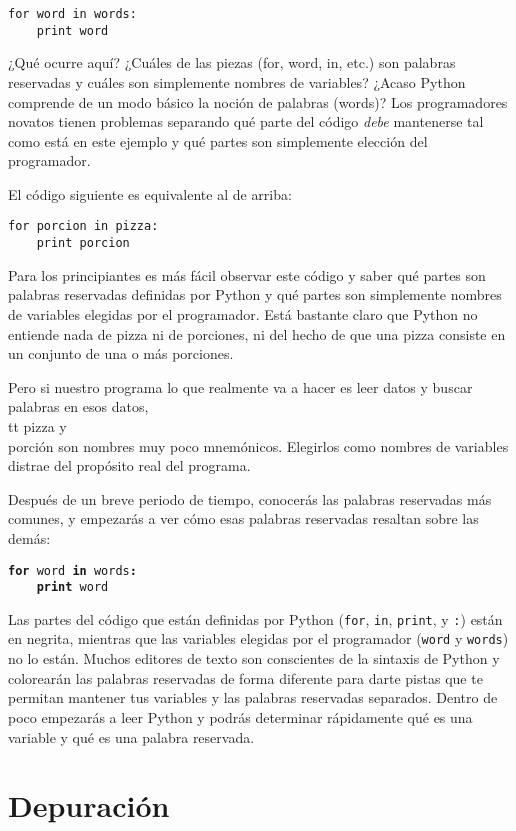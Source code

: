 \beforeverb
\begin{verbatim}
for word in words:
    print word
\end{verbatim}
\afterverb
%
¿Qué ocurre aquí? ¿Cuáles de las piezas (for, word, in, etc.) son palabras reservadas
y cuáles son simplemente nombres de variables? ¿Acaso Python comprende de un modo
básico la noción de palabras (words)? Los programadores novatos tienen
problemas separando qué parte del código
\emph{debe} mantenerse tal como está en este ejemplo y qué partes son simplemente
elección del programador.

El código siguiente es equivalente al de arriba:

\beforeverb
\begin{verbatim}
for porcion in pizza:
    print porcion
\end{verbatim}
\afterverb
%
Para los principiantes es más fácil observar este código y saber qué partes
son palabras reservadas definidas por Python y qué partes son simplemente nombres
de variables elegidas por el programador. Está bastante claro que Python no
entiende nada de pizza ni de porciones,
ni del hecho de que una pizza consiste en un conjunto de una o más porciones.

Pero si nuestro programa lo que realmente va a hacer es leer datos y buscar palabras en esos datos,
{\\tt pizza} y {\\ porción} son nombres muy poco mnemónicos. Elegirlos como
nombres de variables distrae del propósito real del programa.

Después de un breve periodo de tiempo, conocerás las palabras reservadas más comunes,
y empezarás a ver cómo esas palabras reservadas resaltan sobre las demás:

{\tt {\bf for} word {\bf in} words{\bf :}\\
\verb"    "{\bf print} word }

Las partes del código que están definidas por
Python ({\tt for}, {\tt in}, {\tt print}, y {\tt :}) están en negrita,
mientras que las variables elegidas por el programador ({\tt word} y {\tt words}) no lo están.
Muchos editores de texto son conscientes de la sintaxis de Python
y colorearán las palabras reservadas de forma diferente para darte pistas que te permitan
mantener tus variables y las palabras reservadas separados.
Dentro de poco empezarás a leer Python y podrás determinar rápidamente qué
es una variable y qué es una palabra reservada.

\section{Depuración}

